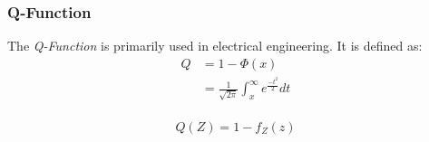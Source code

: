 		\subsubsection{Q-Function} \label{subsubsec:Q-Function}
			\begin{definition}[Q-Function] \label{def:Q-Function}
				The \emph{Q-Function} is primarily used in electrical engineering.
				It is defined as:
				\begin{equation} \label{eq:Q-Function}
					\begin{aligned}
						Q &= 1 - \Phi \left( x \right) \\
						&= \frac{1}{\sqrt{2 \pi}} \int_{x}^{\infty} e^{\frac{-t^{2}}{2}} dt \\
					\end{aligned}
				\end{equation}
				\begin{remark}
					\begin{equation}
						Q \left( Z \right) = 1-f_{Z} \left( z \right)
					\end{equation}
				\end{remark}
			\end{definition}
	
